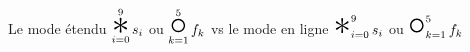 \documentclass[border=3pt]{standalone}
\newcommand{\bigstar}{%
  \mathop{\Huge\mathlarger{\mathlarger{*}}}%
}
\newcommand{\bigcompo}{%
  \mathop{\Huge\mathlarger{\mathlarger{\circ}}}%
}
\begin{document}
Le mode étendu
$\displaystyle \bigstar_{i = 0}^{9} s_i$
ou
$\displaystyle \bigcompo_{k = 1}^{5} f_k$
\quad
vs le mode en ligne 
$\bigstar_{i = 0}^{9} s_i$ ou $\bigcompo_{k = 1}^{5} f_k$
\end{document}
